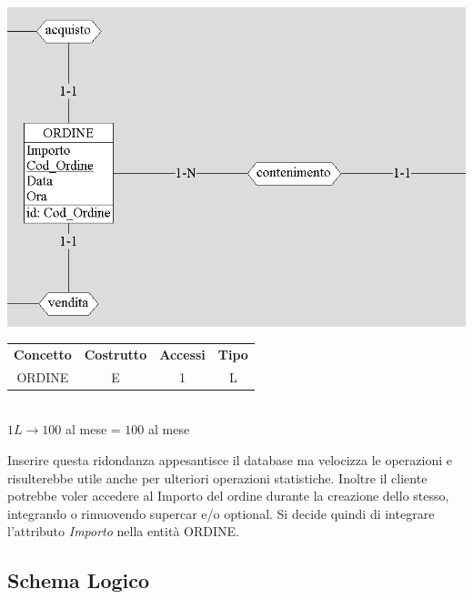 \documentclass[11pt]{article}
\begin{document}
\begin{center}
    \includegraphics[scale=0.80]{images/ordineImporto.png}
\end{center}

\begin{table}[H]
    \centering
    \begin{tabular}{c c c c}
        \rowcolor{red!20!}
        \textbf{Concetto} & \textbf{Costrutto} & \textbf{Accessi} &
        \textbf{Tipo}\\
        ORDINE & E & 1 & L \\
    \end{tabular}\\
    \( 1L \rightarrow 100 \) al mese = \( 100 \) al mese
\end{table}

Inserire questa ridondanza appesantisce il database ma velocizza le operazioni e
risulterebbe utile anche per ulteriori operazioni statistiche. Inoltre il
cliente potrebbe voler accedere al Importo del ordine durante la creazione dello
stesso, integrando o rimuovendo supercar e/o optional.
Si decide quindi di integrare l'attributo \textit{Importo} nella entità ORDINE.

\newpage

\subsection{Schema Logico}
\end{document}
